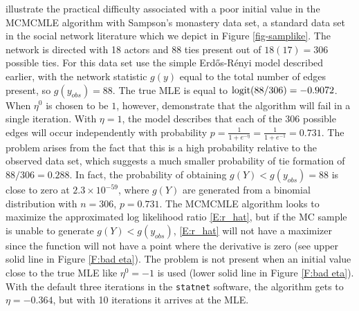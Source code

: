 \citeauthor{ergm} illustrate the practical difficulty associated with a poor initial value in the MCMCMLE algorithm with Sampson's monastery data set, a standard data set in the social network literature which we depict in Figure \ref{fig-samplike}.  The network is directed with 18 actors and 88 ties present out of $18(17)=306$ possible ties.  For this data set \citeauthor{ergm} use the simple Erd\H{o}s-R\'{e}nyi model described earlier, with the network statistic $g(y)$ equal to the total number of edges present, so $g(y_{obs}) = 88$.  The true MLE is equal to $\operatorname{logit}(88/306) = -0.9072$.  When $\eta^0$ is chosen to be $1$, however, \citeauthor{ergm} demonstrate that the algorithm will fail in a single iteration.  With $\eta=1$, the model describes that each of the 306 possible edges will occur independently with probability $p = \frac{1}{1+e^{-\eta}} = \frac{1}{1+e^{-1}} = 0.731$.  The problem arises from the fact that this is a high probability relative to the observed data set, which suggests a much smaller probability of tie formation of $88/306= 0.288$.  In fact, the probability of obtaining $g(Y) < g(y_{obs})=88$ is close to zero at $2.3 \times 10^{-59}$, where $g(Y)$ are generated from a binomial distribution with $n=306$, $p =0.731$.  The MCMCMLE algorithm looks to maximize the approximated log likelihood ratio \eqref{E:r_hat}, but if the MC sample is unable to generate $g(Y)< g(y_{obs})$, \eqref{E:r_hat} will not have a maximizer since the function will not have a point where the derivative is zero (see upper solid line in Figure \ref{F:bad eta}).  The problem is not present when an initial value close to the true MLE like $\eta^0 = -1$ is used (lower solid line in Figure \ref{F:bad eta}).  With the default three iterations in the \texttt{statnet} software, the algorithm gets to $\eta = -0.364$, but with 10 iterations it arrives at the MLE.

